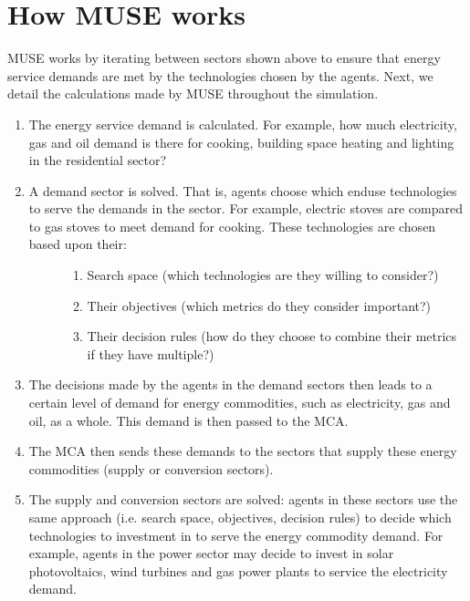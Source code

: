 \documentclass[letterpaper,10pt,english]{sphinxmanual}
\begin{document}
\section{How MUSE works}
\label{\detokenize{overview:how-muse-works}}
MUSE works by iterating between sectors shown above to ensure that energy service demands are met by the technologies chosen by the agents. Next, we detail the calculations made by MUSE throughout the simulation.
\begin{enumerate}
%
\item {} 
The energy service demand is calculated. For example, how much electricity, gas and oil demand is there for cooking, building space heating and lighting in the residential sector?

\item {} \begin{description}
\item[{A demand sector is solved. That is, agents choose which end\sphinxhyphen{}use technologies to serve the demands in the sector. For example, electric stoves are compared to gas stoves to meet demand for cooking. These technologies are chosen based upon their:}] \leavevmode\begin{enumerate}
%
\item {} 
Search space (which technologies are they willing to consider?)

\item {} 
Their objectives (which metrics do they consider important?)

\item {} 
Their decision rules (how do they choose to combine their metrics if they have multiple?)

\end{enumerate}

\end{description}

\item {} 
The decisions made by the agents in the demand sectors then leads to a certain level of demand for energy commodities, such as electricity, gas and oil, as a whole. This demand is then passed to the MCA.

\item {} 
The MCA then sends these demands to the sectors that supply these energy commodities (supply or conversion sectors).

\item {} 
The supply and conversion sectors are solved: agents in these sectors use the same approach (i.e. search space, objectives, decision rules) to decide which technologies to investment in to serve the energy commodity demand. For example, agents in the power sector may decide to invest in solar photovoltaics, wind turbines and gas power plants to service the electricity demand.


\end{enumerate}
\end{document}
